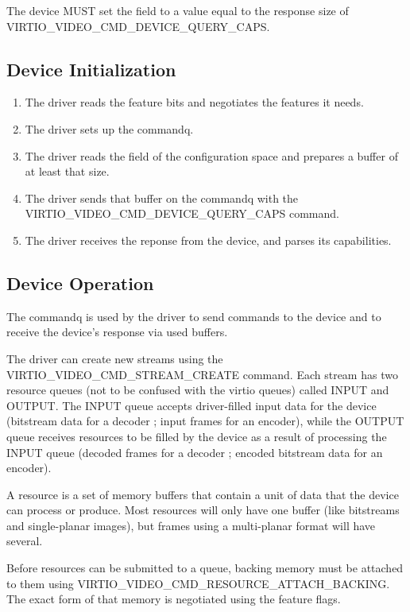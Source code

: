 The device MUST set the  field to a value equal to
the response size of VIRTIO\_VIDEO\_CMD\_DEVICE\_QUERY\_CAPS.

\subsection{Device Initialization}\label{sec:Device Types / Video Device / Device Initialization}

\begin{enumerate}
\def\labelenumi{\arabic{enumi}.}
\item
  The driver reads the feature bits and negotiates the features it
  needs.
\item
  The driver sets up the commandq.
\item
  The driver reads the  field of the configuration
  space and prepares a buffer of at least that size.
\item
  The driver sends that buffer on the commandq with the
  VIRTIO\_VIDEO\_CMD\_DEVICE\_QUERY\_CAPS command.
\item
  The driver receives the reponse from the device, and parses its
  capabilities.
\end{enumerate}

\subsection{Device Operation}\label{sec:Device Types / Video Device / Device Operation}

The commandq is used by the driver to send commands to the device and to
receive the device's response via used buffers.

The driver can create new streams using the
VIRTIO\_VIDEO\_CMD\_STREAM\_CREATE command. Each stream has two resource
queues (not to be confused with the virtio queues) called INPUT and
OUTPUT. The INPUT queue accepts driver-filled input data for the device
(bitstream data for a decoder ; input frames for an encoder), while the
OUTPUT queue receives resources to be filled by the device as a result
of processing the INPUT queue (decoded frames for a decoder ; encoded
bitstream data for an encoder).

A resource is a set of memory buffers that contain a unit of data that
the device can process or produce. Most resources will only have one
buffer (like bitstreams and single-planar images), but frames using a
multi-planar format will have several.

Before resources can be submitted to a queue, backing memory must be
attached to them using VIRTIO\_VIDEO\_CMD\_RESOURCE\_ATTACH\_BACKING.
The exact form of that memory is negotiated using the feature flags.

